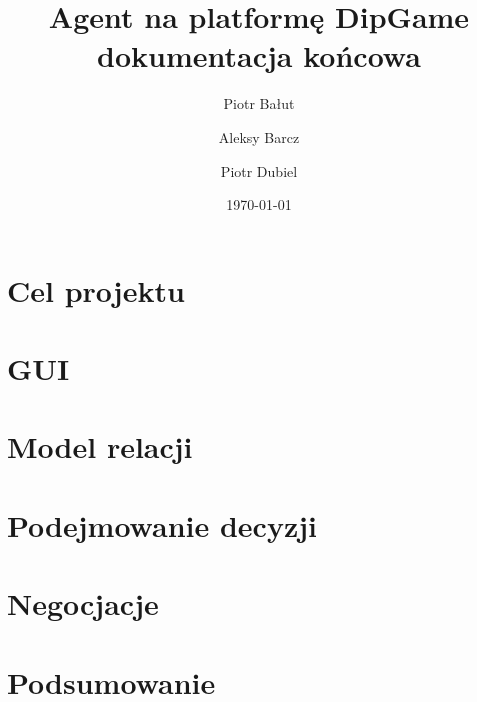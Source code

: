 \documentclass[11pt,a4paper]{report}
\date {\today}
\author {
	Piotr Bałut
	\and
	Aleksy Barcz
	\and
	Piotr Dubiel}
\title{Agent na platformę DipGame\\dokumentacja końcowa}
\begin{document}
\maketitle
\tableofcontents



\chapter{Cel projektu}


%

\chapter{GUI}


\chapter{Model relacji}



\chapter{Podejmowanie decyzji}


\chapter{Negocjacje}


\chapter{Podsumowanie}

%

%

%

\nocite{*}

\end{document}
